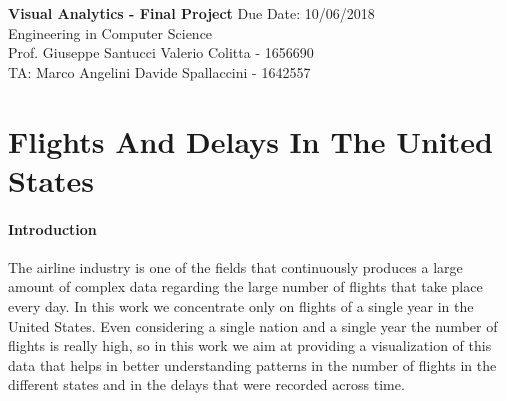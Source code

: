 \documentclass[a4paper, 12pt]{article}
\begin{document}
\noindent
\large\textbf{Visual Analytics - Final Project} \normalsize \hfill Due Date: 10/06/2018 \\
\normalsize Engineering in Computer Science   \\
Prof. Giuseppe Santucci \hfill Valerio Colitta - 1656690 \\
TA: Marco Angelini \hfill Davide Spallaccini - 1642557

\section*{Flights And Delays In The United States}

\paragraph{Introduction}
The airline industry is one of the fields that continuously produces a large amount of complex data
regarding the large number of flights that take place every day. In this work we concentrate only on
flights of a single year in the United States. Even considering a single nation and a single year the
number of flights is really high, so in this work we aim at providing a visualization of this data that
helps in better understanding patterns in the number of flights in the different states and in the 
delays that were recorded across time.
\end{document}
